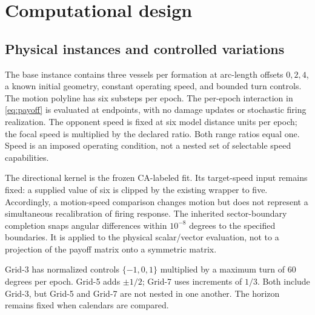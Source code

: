 \section{Computational design}\label{sec:methods}

\subsection{Physical instances and controlled variations}
The base instance contains three vessels per formation at arc-length offsets
$0,2,4$, a known initial geometry, constant operating speed, and bounded
turn controls. The motion polyline has six substeps per epoch. The per-epoch
interaction in \eqref{eq:payoff} is evaluated at endpoints, with no damage
updates or stochastic firing realization. The opponent speed is fixed at
six model distance units per epoch; the focal speed is multiplied by the
declared ratio. Both range ratios equal one. Speed is an imposed operating
condition, not a nested set of selectable speed capabilities.

The directional kernel is the frozen CA-labeled fit. Its target-speed
input remains fixed: a supplied value of six is clipped by the existing
wrapper to five. Accordingly, a motion-speed comparison changes motion
but does not represent a simultaneous recalibration of firing response.
The inherited sector-boundary completion snaps angular differences within
$10^{-8}$ degrees to the specified boundaries. It is applied to the
physical scalar/vector evaluation, not to a projection of the payoff matrix
onto a symmetric matrix.

Grid-3 has normalized controls $\{-1,0,1\}$ multiplied by a maximum turn
of $60$ degrees per epoch. Grid-5 adds $\pm1/2$; Grid-7 uses increments
of $1/3$. Both include Grid-3, but Grid-5 and Grid-7 are not nested in
one another. The horizon remains fixed when calendars are compared.

